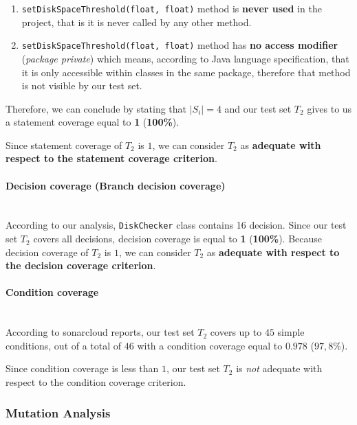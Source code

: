 \documentclass[sigconf]{acmart}
\newcommand{\abs}[1]{\left|#1\right|}
\begin{document}
\begin{enumerate}
\item \texttt{setDiskSpaceThreshold(float, float)} method is \textbf{never used} in the project, that is it is never called by any other method.
\item \texttt{setDiskSpaceThreshold(float, float)} method has \textbf{no access modifier} (\textit{package private}) which means, according to Java language specification, that it is only accessible within classes in the same package, therefore that method is not visible by our test set.
\end{enumerate}

Therefore, we can conclude by stating that $\abs{S_i} = 4$ and our test set $T_2$ gives to us a statement coverage equal to \textbf{1} (\textbf{100\%}).

Since statement coverage of $T_2$ is $1$, we can consider $T_2$ as \textbf{adequate with respect to the statement coverage criterion}.

\paragraph{Decision coverage (Branch decision coverage)}
\hfill\\

According to our analysis, \texttt{DiskChecker} class contains 16 decision. Since our test set $T_2$ covers all decisions, decision coverage is equal to \textbf{1} (\textbf{100\%}). Because decision coverage of $T_2$ is $1$, we can consider $T_2$ as \textbf{adequate with respect to the decision coverage criterion}.

\paragraph{Condition coverage}
\hfill\\

According to sonarcloud reports, our test set $T_2$ covers up to $45$ simple conditions, out of a total of $46$ with a condition coverage equal to $0.978$ ($97,8\%$).

Since condition coverage is less than $1$, our test set $T_2$ is \textit{not} adequate with respect to the condition coverage criterion. 

\subsubsection{Mutation Analysis}
\hfill\\
\end{document}
